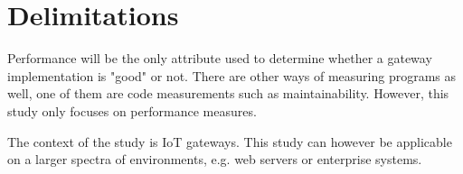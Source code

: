 \section{Delimitations}
\label{sec:delimitations}

Performance will be the only attribute used to determine whether a gateway
implementation is "good" or not. There are other ways of measuring programs as
well, one of them are code measurements such as maintainability. However, this
study only focuses on performance measures.

The context of the study is IoT gateways. This study can however be applicable
on a larger spectra of environments, e.g. web servers or enterprise systems.
